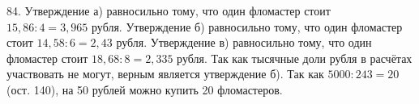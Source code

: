 84. Утверждение а) равносильно тому, что один фломастер стоит $15,86:4=3,965$ рубля. Утверждение б) равносильно тому, что один фломастер стоит $14,58:6=2,43$ рубля. Утверждение в) равносильно тому, что один фломастер стоит $18,68:8=2,335$ рубля. Так как тысячные доли рубля в расчётах участвовать не могут, верным является утверждение б).  Так как $5000:243=20$ (ост. 140), на 50 рублей можно купить 20 фломастеров.\\
